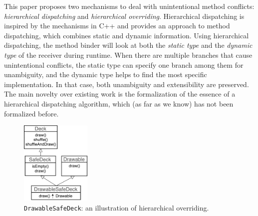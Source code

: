 


This paper proposes two mechanisms to deal with unintentional method
conflicts: \textit{hierarchical dispatching} and \emph{hierarchical
  overriding}. Hierarchical dispatching is inspired by the mechanisms in C++ and
provides an approach
to method dispatching, which combines static and dynamic
information. Using hierarchical dispatching, the method binder will look
at both the \emph{static type} and the \emph{dynamic type} of the
receiver during runtime. When there are multiple branches that cause
unintentional conflicts, the static type can specify one branch among
them for unambiguity, and the dynamic type helps to find the most
specific implementation. In that case, both unambiguity and
extensibility are preserved. The main novelty over existing work is 
the formalization of the essence of a hierarchical dispatching
algorithm, which (as far as we know) has not been formalized before. 

\begin{figure}
\center  \includegraphics[height=4cm]{pics/DrawableSafeDeck3.pdf}
\caption{\lstinline|DrawableSafeDeck|: an illustration of hierarchical overriding.}
\label{fig:main}
\end{figure}

